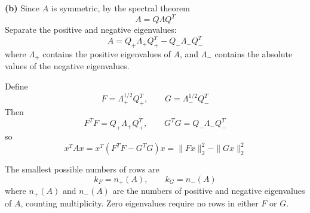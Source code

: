 

\textbf{(b)}
Since \(A\) is symmetric, by the spectral theorem
\[
A=Q\Lambda Q^T
\]
Separate the positive and negative eigenvalues:
\[
A=Q_+\Lambda_+Q_+^T-Q_-\Lambda_-Q_-^T
\]
where \(\Lambda_+\) contains the positive eigenvalues of \(A\), and
\(\Lambda_-\) contains the absolute values of the negative eigenvalues.

Define
\[
F=\Lambda_+^{1/2}Q_+^T,
\qquad
G=\Lambda_-^{1/2}Q_-^T
\]
Then
\[
F^TF=Q_+\Lambda_+Q_+^T,
\qquad
G^TG=Q_-\Lambda_-Q_-^T
\]
so
\[
x^TAx
=x^T(F^TF-G^TG)x
=\|Fx\|_2^2-\|Gx\|_2^2
\]

The smallest possible numbers of rows are
\[
\boxed{k_F=n_+(A),\qquad k_G=n_-(A)}
\]
where \(n_+(A)\) and \(n_-(A)\) are the numbers of positive and negative
eigenvalues of \(A\), counting multiplicity. Zero eigenvalues require no rows
in either \(F\) or \(G\).

